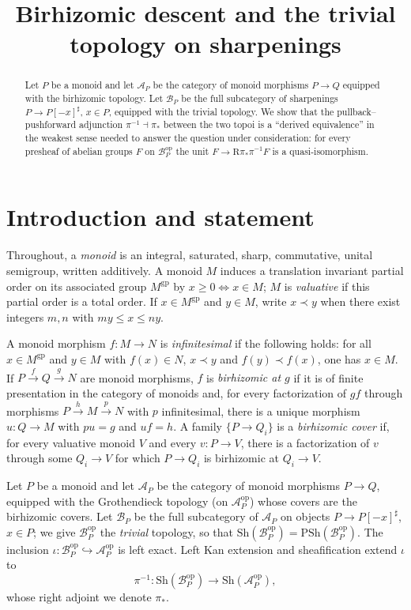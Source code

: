 \documentclass[11pt]{article}
\title{Birhizomic descent and the trivial topology on sharpenings}
\author{}
\date{}
\theoremstyle{definition}
\theoremstyle{remark}
\newcommand{\Sh}{\mathrm{Sh}}
\newcommand{\PSh}{\mathrm{PSh}}
\newcommand{\Acal}{\mathcal{A}}
\newcommand{\Bcal}{\mathcal{B}}
\newcommand{\op}{\mathrm{op}}
\begin{document}
\maketitle

\begin{abstract}
Let $P$ be a monoid and let $\Acal_P$ be the category of monoid morphisms
$P \to Q$ equipped with the birhizomic topology.  Let $\Bcal_P$ be the full
subcategory of sharpenings $P \to P[-x]^{\sharp}$, $x \in P$, equipped with the
trivial topology.  We show that the pullback--pushforward adjunction
$\pi^{-1} \dashv \pi_*$ between the two topoi is a ``derived equivalence'' in the
weakest sense needed to answer the question under consideration: for every
presheaf of abelian groups $F$ on $\Bcal_P^{\op}$ the unit
$F \to \mathrm{R}\pi_*\pi^{-1}F$ is a quasi-isomorphism.
\end{abstract}

\tableofcontents

\section{Introduction and statement}

Throughout, a \emph{monoid} is an integral, saturated, sharp, commutative,
unital semigroup, written additively.  A monoid $M$ induces a translation
invariant partial order on its associated group $M^{\mathrm{gp}}$ by
$x \geq 0 \iff x \in M$; $M$ is \emph{valuative} if this partial order is a
total order.  If $x \in M^{\mathrm{gp}}$ and $y \in M$, write $x \prec y$ when
there exist integers $m,n$ with $my \le x \le ny$.

A monoid morphism $f : M \to N$ is \emph{infinitesimal} if the following holds:
for all $x \in M^{\mathrm{gp}}$ and $y \in M$ with $f(x) \in N$, $x \prec y$ and
$f(y) \prec f(x)$, one has $x \in M$.  If
$P \xrightarrow{f} Q \xrightarrow{g} N$ are monoid morphisms, $f$ is
\emph{birhizomic at $g$} if it is of finite presentation in the category of
monoids and, for every factorization of $gf$ through morphisms
$P \xrightarrow{h} M \xrightarrow{p} N$ with $p$ infinitesimal, there is a
unique morphism $u : Q \to M$ with $pu = g$ and $uf = h$.  A family
$\{P \to Q_i\}$ is a \emph{birhizomic cover} if, for every valuative monoid $V$
and every $v : P \to V$, there is a factorization of $v$ through some
$Q_i \to V$ for which $P \to Q_i$ is birhizomic at $Q_i \to V$.

Let $P$ be a monoid and let $\Acal_P$ be the category of monoid morphisms
$P \to Q$, equipped with the Grothendieck topology (on $\Acal_P^{\op}$) whose
covers are the birhizomic covers.  Let $\Bcal_P$ be the full subcategory of
$\Acal_P$ on objects $P \to P[-x]^{\sharp}$, $x \in P$; we give
$\Bcal_P^{\op}$ the \emph{trivial} topology, so that
$\Sh(\Bcal_P^{\op}) = \PSh(\Bcal_P^{\op})$.  The inclusion
$\iota : \Bcal_P^{\op} \hookrightarrow \Acal_P^{\op}$ is left exact.  Left Kan
extension and sheafification extend $\iota$ to
\[
   \pi^{-1} : \Sh(\Bcal_P^{\op}) \longrightarrow \Sh(\Acal_P^{\op}),
\]
whose right adjoint we denote $\pi_*$.
\end{document}
